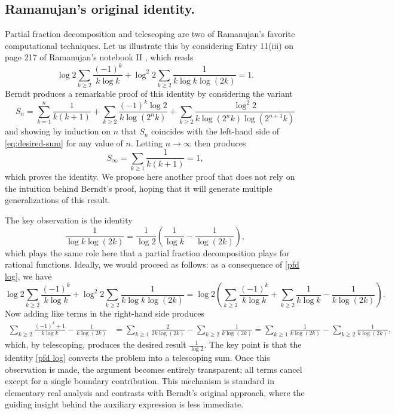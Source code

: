 \documentclass[11pt,oneside,reqno]{article}
\theoremstyle{definition}
\begin{document}
\subsection{Ramanujan's original identity.}
Partial fraction decomposition and telescoping are two of Ramanujan's favorite computational techniques. Let us illustrate this by considering Entry 11(iii) on page 217 of Ramanujan's  notebook II \cite{R2}, which reads
\begin{equation}\label{eq:desired-sum}
\log2\sum_{k\ge2}\frac{\left(-1\right)^{k}}{k\log k}+\log^{2}2\sum_{k\ge2}\frac{1}{k\log k\log\left(2k\right)}=1.
\end{equation}
Berndt produces a remarkable proof of this identity by considering the variant
\begin{equation}\label{eq:sn-version}
S_{n}=\sum_{k=1}^{n}\frac{1}{k\left(k+1\right)}+\sum_{k\ge2}\frac{\left(-1\right)^{k}\log2}{k\log\left(2^{n}k\right)}+\sum_{k\ge2}\frac{\log^{2}2}{k\log\left(2^{n}k\right)\log\left(2^{n+1}k\right)}
\end{equation}
and showing by induction on $n$ that $S_{n}$ coincides with the left-hand side of  \eqref{eq:desired-sum} for any value of $n$. Letting $n\to\infty$ then produces
\begin{equation}
S_{\infty}=\sum_{k\ge1}\frac{1}{k\left(k+1\right)}=1,
\end{equation}
which proves the identity. We propose here another proof that does not rely on the intuition behind Berndt's  proof, hoping that it will generate multiple generalizations of this result.

The key observation is the identity
\begin{equation}
\label{pfd log}
\frac{1}{\log k\log\left(2k\right)}=\frac{1}{\log2}\left(\frac{1}{\log k}-\frac{1}{\log\left(2k\right)}\right),
\end{equation}
which plays the same role here that a partial fraction decomposition plays for rational functions.
Ideally, we would proceed as follows: as a consequence of \eqref{pfd log}, we have
\begin{equation}
\log2\sum_{k\ge2}\frac{\left(-1\right)^{k}}{k\log k}+\log^{2}2\sum_{k\ge2}\frac{1}{k\log k\log\left(2k\right)}
=\log2\left(\sum_{k\ge2}\frac{\left(-1\right)^{k}}{k\log k}+\sum_{k\ge2}\frac{1}{k\log k}-\frac{1}{k\log\left(2k\right)}\right).
\end{equation}
Now adding like terms in the right-hand side produces
\begin{align}
\sum_{k\ge2}\frac{\left(-1\right)^{k}+1}{k\log k}-\frac{1}{k\log\left(2k\right)}&=\sum_{k\ge1}\frac{2}{2k\log\left(2k\right)}-\sum_{k\ge2}\frac{1}{k\log\left(2k\right)}
=\sum_{k\ge1}\frac{1}{k\log\left(2k\right)}-\sum_{k\ge2}\frac{1}{k\log\left(2k\right)},
\end{align}
which, by telescoping, produces the desired result $\frac{1}{\log2}.$ The key point is that the identity \eqref{pfd log} converts the problem into a telescoping sum. Once this observation is made, the argument becomes entirely transparent; all terms cancel except for a single boundary contribution. This mechanism is standard in elementary
real analysis and contrasts with Berndt’s original approach, where the guiding insight behind the auxiliary expression is less immediate.
\end{document}
